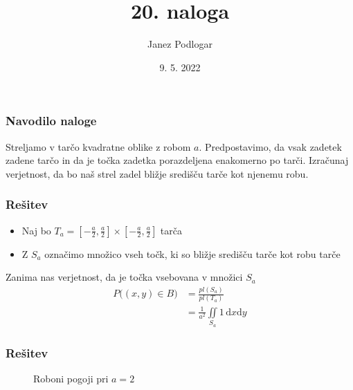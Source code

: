 \documentclass{beamer}
\begin{document}
\title{20. naloga}
\author{Janez Podlogar}
\date{9. 5. 2022}

\begin{frame}
    \titlepage
\end{frame}

\begin{frame}
    \frametitle{Navodilo naloge}
Streljamo v tarčo kvadratne oblike z robom $a$. Predpostavimo, da vsak zadetek zadene
tarčo in da je točka zadetka porazdeljena enakomerno po tarči. Izračunaj verjetnost, da
bo naš strel zadel bližje središču tarče kot njenemu robu.
\end{frame}

\begin{frame}
    \frametitle{Rešitev}
\begin{itemize}
    \item Naj bo $T_a = \left[ -\frac{a}{2} , \frac{a}{2}\right]\times\left[-\frac{a}{2},\frac{a}{2}\right]$ tarča
    \item Z $S_a$ označimo množico vseh točk, ki so bližje središču tarče kot robu tarče
\end{itemize}
Zanima nas verjetnost, da je točka vsebovana v množici $S_a$
\begin{align*}
    P\big((x,y) \in B\big)
    &= \frac{pl(S_a)}{pl(T_a)} \\[1em]
    &= \frac{1}{a^2} \iint\limits_{S_a} 1 \, \mathrm{d}x\mathrm{d}y
\end{align*}
\end{frame}

\begin{frame}
    \frametitle{Rešitev}
    \begin{figure}[h!]
        \centering
        \caption{Roboni pogoji pri $a=2$}
    \end{figure}
\end{frame}
\end{document}
